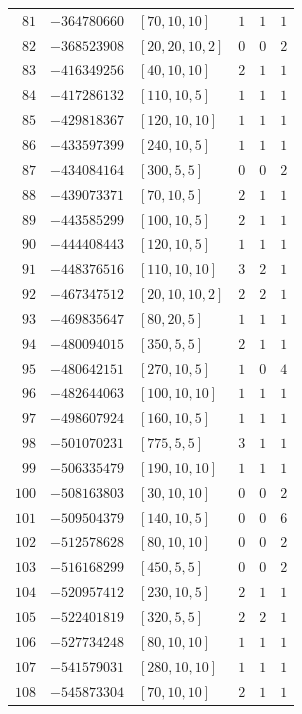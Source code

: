 \documentclass[11pt]{article}
\begin{document}
\begin{center}
\begin{longtable}{r r l c c c}
$81$ & $-364780660$ & $[70,10,10]$ & $1$ & $1$ & $1$\\
$82$ & $-368523908$ & $[20,20,10,2]$ & $0$ & $0$ & $2$\\
$83$ & $-416349256$ & $[40,10,10]$ & $2$ & $1$ & $1$\\
$84$ & $-417286132$ & $[110,10,5]$ & $1$ & $1$ & $1$\\
$85$ & $-429818367$ & $[120,10,10]$ & $1$ & $1$ & $1$\\
$86$ & $-433597399$ & $[240,10,5]$ & $1$ & $1$ & $1$\\
$87$ & $-434084164$ & $[300,5,5]$ & $0$ & $0$ & $2$\\
$88$ & $-439073371$ & $[70,10,5]$ & $2$ & $1$ & $1$\\
$89$ & $-443585299$ & $[100,10,5]$ & $2$ & $1$ & $1$\\
$90$ & $-444408443$ & $[120,10,5]$ & $1$ & $1$ & $1$\\
$91$ & $-448376516$ & $[110,10,10]$ & $3$ & $2$ & $1$\\
$92$ & $-467347512$ & $[20,10,10,2]$ & $2$ & $2$ & $1$\\
$93$ & $-469835647$ & $[80,20,5]$ & $1$ & $1$ & $1$\\
$94$ & $-480094015$ & $[350,5,5]$ & $2$ & $1$ & $1$\\
$95$ & $-480642151$ & $[270,10,5]$ & $1$ & $0$ & $4$\\
$96$ & $-482644063$ & $[100,10,10]$ & $1$ & $1$ & $1$\\
$97$ & $-498607924$ & $[160,10,5]$ & $1$ & $1$ & $1$\\
$98$ & $-501070231$ & $[775,5,5]$ & $3$ & $1$ & $1$\\
$99$ & $-506335479$ & $[190,10,10]$ & $1$ & $1$ & $1$\\
$100$ & $-508163803$ & $[30,10,10]$ & $0$ & $0$ & $2$\\
$101$ & $-509504379$ & $[140,10,5]$ & $0$ & $0$ & $6$\\
$102$ & $-512578628$ & $[80,10,10]$ & $0$ & $0$ & $2$\\
$103$ & $-516168299$ & $[450,5,5]$ & $0$ & $0$ & $2$\\
$104$ & $-520957412$ & $[230,10,5]$ & $2$ & $1$ & $1$\\
$105$ & $-522401819$ & $[320,5,5]$ & $2$ & $2$ & $1$\\
$106$ & $-527734248$ & $[80,10,10]$ & $1$ & $1$ & $1$\\
$107$ & $-541579031$ & $[280,10,10]$ & $1$ & $1$ & $1$\\
$108$ & $-545873304$ & $[70,10,10]$ & $2$ & $1$ & $1$\\

\end{longtable}
\end{center}
\end{document}

